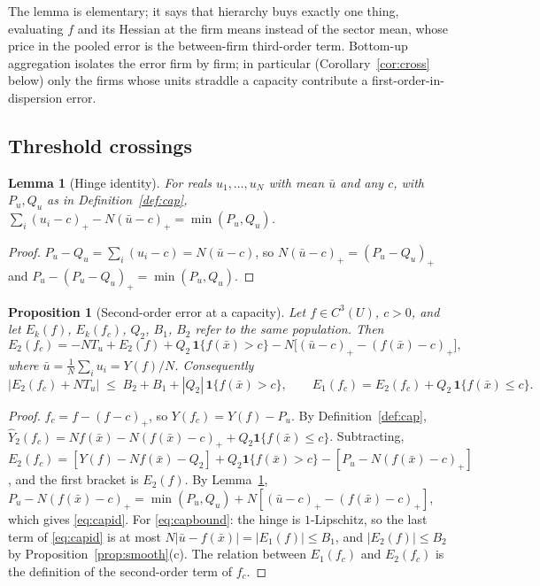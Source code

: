 \documentclass[10pt,a4paper]{article}
\theoremstyle{plain}
\newtheorem{proposition}[theorem]{Proposition}
\newtheorem{lemma}[theorem]{Lemma}
\theoremstyle{definition}
\theoremstyle{remark}
\newcommand{\Yh}{\widehat{Y}}
\newcommand{\Tu}{T_u}
\begin{document}
The lemma is elementary; it says that hierarchy buys exactly one thing, evaluating $f$ and its Hessian at the firm means instead of the sector mean, whose price in the pooled error is the between-firm third-order term. Bottom-up aggregation isolates the error firm by firm; in particular (Corollary~\ref{cor:cross} below) only the firms whose units straddle a capacity contribute a first-order-in-dispersion error.

\subsection{Threshold crossings}\label{sec:threshold}

\begin{lemma}[Hinge identity]\label{lem:hinge}
For reals $u_1,\dots,u_N$ with mean $\bar u$ and any $c$, with $P_u,Q_u$ as in Definition~\ref{def:cap}, $\sum_i(u_i-c)_+-N(\bar u-c)_+=\min(P_u,Q_u)$.
\end{lemma}
\begin{proof}
$P_u-Q_u=\sum_i(u_i-c)=N(\bar u-c)$, so $N(\bar u-c)_+=(P_u-Q_u)_+$ and $P_u-(P_u-Q_u)_+=\min(P_u,Q_u)$.
\end{proof}

\begin{proposition}[Second-order error at a capacity]\label{prop:cap}
Let $f\in C^3(U)$, $c>0$, and let $E_k(f)$, $E_k(f_c)$, $Q_2$, $B_1$, $B_2$ refer to the same population. Then
\begin{equation}\label{eq:capid}
E_2(f_c)=-N\Tu+E_2(f)+Q_2\,\mathbf 1\{f(\bar x)>c\}-N\big[(\bar u-c)_+-(f(\bar x)-c)_+\big],
\end{equation}
where $\bar u=\frac1N\sum_iu_i=Y(f)/N$. Consequently
\begin{equation}\label{eq:capbound}
\big|E_2(f_c)+N\Tu\big|\;\le\;B_2+B_1+|Q_2|\,\mathbf 1\{f(\bar x)>c\},
\qquad E_1(f_c)=E_2(f_c)+Q_2\,\mathbf 1\{f(\bar x)\le c\}.
\end{equation}
\end{proposition}
\begin{proof}
$f_c=f-(f-c)_+$, so $Y(f_c)=Y(f)-P_u$. By Definition~\ref{def:cap}, $\Yh_2(f_c)=Nf(\bar x)-N(f(\bar x)-c)_++Q_2\mathbf 1\{f(\bar x)\le c\}$. Subtracting, $E_2(f_c)=[Y(f)-Nf(\bar x)-Q_2]+Q_2\mathbf 1\{f(\bar x)>c\}-[P_u-N(f(\bar x)-c)_+]$, and the first bracket is $E_2(f)$. By Lemma~\ref{lem:hinge}, $P_u-N(f(\bar x)-c)_+=\min(P_u,Q_u)+N[(\bar u-c)_+-(f(\bar x)-c)_+]$, which gives \eqref{eq:capid}. For \eqref{eq:capbound}: the hinge is $1$-Lipschitz, so the last term of \eqref{eq:capid} is at most $N|\bar u-f(\bar x)|=|E_1(f)|\le B_1$, and $|E_2(f)|\le B_2$ by Proposition~\ref{prop:smooth}(c). The relation between $E_1(f_c)$ and $E_2(f_c)$ is the definition of the second-order term of $f_c$.
\end{proof}
\end{document}
